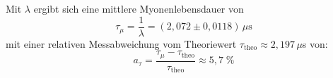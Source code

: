         Mit $\lambda$ ergibt sich eine mittlere Myonenlebensdauer von
        \begin{equation*}
            \tau_{\mu} = \frac{1}{\lambda} = (2,072 \pm 0,0118) \, \mu\text{s}
        \end{equation*}
        mit einer relativen Messabweichung vom Theoriewert $\tau_{\text{theo}} \approx 2,197 \, \mu$s \cite{zyla_review_2020} von:
        \begin{equation*}
            a_{\tau} = \frac{\tau_{\mu} - \tau_{\text{theo}}}{\tau_{\text{theo}}} \approx 5,7 \;\%    
        \end{equation*}


















































